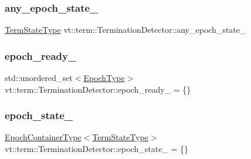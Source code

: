 \subsubsection{\texorpdfstring{any\+\_\+epoch\+\_\+state\+\_\+}{any\_epoch\_state\_}}
{\footnotesize\ttfamily \hyperlink{structvt_1_1term_1_1_term_action_ae4c635b69751d887666814700ed64d65}{Term\+State\+Type} vt\+::term\+::\+Termination\+Detector\+::any\+\_\+epoch\+\_\+state\+\_\+\hspace{0.3cm}{\ttfamily [private]}}

\mbox{\label{structvt_1_1term_1_1_termination_detector_a22c7c6cc9c6cd48b5570dbae226a56f3}} 
\subsubsection{\texorpdfstring{epoch\+\_\+ready\+\_\+}{epoch\_ready\_}}
{\footnotesize\ttfamily std\+::unordered\+\_\+set$<$\hyperlink{namespacevt_a81d11b28122d43bf9834577e4a06440f}{Epoch\+Type}$>$ vt\+::term\+::\+Termination\+Detector\+::epoch\+\_\+ready\+\_\+ = \{\}\hspace{0.3cm}{\ttfamily [private]}}

\mbox{\label{structvt_1_1term_1_1_termination_detector_a0c55ef5345253002f9de6e5c4337c53a}} 
\subsubsection{\texorpdfstring{epoch\+\_\+state\+\_\+}{epoch\_state\_}}
{\footnotesize\ttfamily \hyperlink{structvt_1_1term_1_1_termination_detector_a69e2615b61e072977463eea5b20b7933}{Epoch\+Container\+Type}$<$\hyperlink{structvt_1_1term_1_1_term_action_ae4c635b69751d887666814700ed64d65}{Term\+State\+Type}$>$ vt\+::term\+::\+Termination\+Detector\+::epoch\+\_\+state\+\_\+ = \{\}\hspace{0.3cm}{\ttfamily [private]}}

